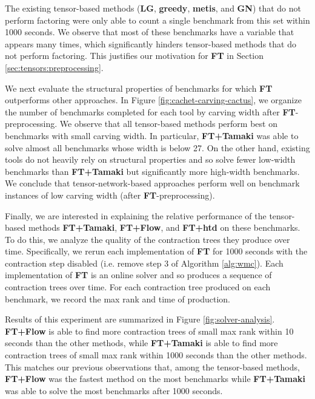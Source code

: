 The existing tensor-based methods (\textbf{LG}, \textbf{greedy}, \textbf{metis}, and \textbf{GN}) that do not perform factoring were only able to count a single benchmark from this set within 1000 seconds. We observe that most of these benchmarks have a variable that appears many times, which significantly hinders tensor-based methods that do not perform factoring. This justifies our motivation for \textbf{FT} in Section \ref{sec:tensors:preprocessing}.

We next evaluate the structural properties of benchmarks for which \textbf{FT} outperforms other approaches. In Figure \ref{fig:cachet-carving-cactus}, we organize the number of benchmarks completed for each tool by carving width after \textbf{FT}-preprocessing. We observe that all tensor-based methods perform best on benchmarks with small carving width. In particular, \textbf{FT+Tamaki} was able to solve almost all benchmarks whose width is below 27. On the other hand, existing tools do not heavily rely on structural properties and so solve fewer low-width benchmarks than \textbf{FT+Tamaki} but significantly more high-width benchmarks. We conclude that tensor-network-based approaches perform well on benchmark instances of low carving width (after  \textbf{FT}-preprocessing).

Finally, we are interested in explaining the relative performance of the tensor-based methods \textbf{FT+Tamaki}, \textbf{FT+Flow}, and \textbf{FT+htd} on these benchmarks. To do this, we analyze the quality of the contraction trees they produce over time. Specifically, we rerun each implementation of \textbf{FT} for 1000 seconds with the contraction step disabled (i.e. remove step 3 of Algorithm \ref{alg:wmc}). Each implementation of \textbf{FT} is an online solver and so produces a sequence of contraction trees over time. For each contraction tree produced on each benchmark, we record the max rank and time of production.

Results of this experiment are summarized in Figure \ref{fig:solver-analysis}. 
\textbf{FT+Flow} is able to find more contraction trees of small max rank within 10 seconds than the other methods, while \textbf{FT+Tamaki} is able to find more contraction trees of small max rank within 1000 seconds than the other methods. This matches our previous observations that, among the tensor-based methods, \textbf{FT+Flow} was the fastest method on the most benchmarks while \textbf{FT+Tamaki} was able to solve the most benchmarks after 1000 seconds.


